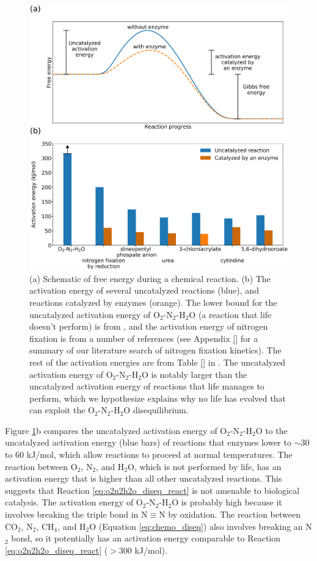 \begin{figure}
  \centering
  \includegraphics[width=1.0\textwidth]{tex/2diseq/Figure4.pdf}
  \caption{(a) Schematic of free energy during a chemical reaction. (b) The activation energy of several uncatalyzed reactions (blue), and reactions catalyzed by enzymes (orange). The lower bound for the uncatalyzed activation energy of O$_2$-N$_2$-H$_2$O (a reaction that life doesn't perform) is from \citet{Dixon_1984}, and the activation energy of nitrogen fixation is from a number of references \citep{Andersen_1977,Hageman_1980} (see 
  Appendix \ref{} %
  for a summary of our literature search of nitrogen fixation kinetics). The rest of the activation energies are from 
  Table \ref{} %
  in \citet{Wolfenden_2006}. The uncatalyzed activation energy of O$_2$-N$_2$-H$_2$O is notably larger than the uncatalyzed activation energy of reactions that life manages to perform, which we hypothesize explains why no life has evolved that can exploit the O$_2$-N$_2$-H$_2$O disequilibrium.}
  \label{fig:diseq_figure4}
\end{figure}

Figure \ref{fig:diseq_figure4}b compares the uncatalyzed activation energy of O$_2$-N$_2$-H$_2$O to the uncatalyzed activation energy (blue bars) of reactions that enzymes lower to $\sim 30$ to 60 kJ/mol, which allow reactions to proceed at normal temperatures. The reaction between O$_2$, N$_2$, and H$_2$O, which is not performed by life, has an activation energy that is higher than all other uncatalyzed reactions. This suggests that Reaction \eqref{eq:o2n2h2o_diseq_react} is not amenable to biological catalysis. The activation energy of O$_2$-N$_2$-H$_2$O is probably high because it involves breaking the triple bond in $\mathrm{N \equiv N}$ by oxidation. The reaction between CO$_2$, N$_2$, CH$_4$, and H$_2$O (Equation \eqref{eq:chemo_diseq}) also involves breaking an N$_2$ bond, so it potentially has an activation energy comparable to Reaction \eqref{eq:o2n2h2o_diseq_react} ($> 300$ kJ/mol).

